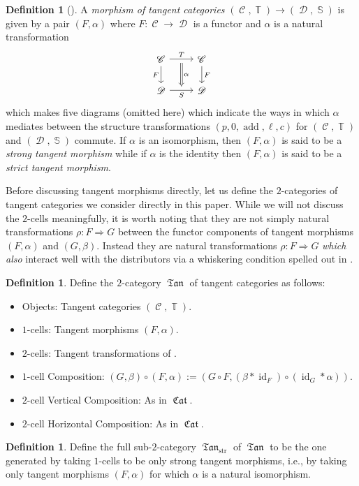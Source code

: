 \documentclass{amsart}
\theoremstyle{definition}
\newtheorem{definition}[equation]{Definition}
\DeclareMathOperator{\Cscr}{\mathscr{C}}
\DeclareMathOperator{\Dscr}{\mathscr{D}}
\DeclareMathOperator{\Sbb}{\mathbb{S}}
\DeclareMathOperator{\Tbb}{\mathbb{T}}
\DeclareMathOperator{\fTan}{\mathfrak{Tan}}
\DeclareMathOperator{\id}{id}
\DeclareMathOperator{\fCat}{\mathfrak{Cat}}
\numberwithin{equation}{subsection}
\begin{document}
\begin{definition}[{\cite[Definition 2.7]{GeoffRobinDiffStruct}}]\label{Defn: Tangent morphism}
	A \emph{morphism of tangent categories} $(\Cscr,\Tbb) \to (\Dscr,\Sbb)$ is given by a pair $(F,\alpha)$ where $F:\Cscr \to \Dscr$ is a functor and $\alpha$ is a natural transformation
	\[
	\begin{tikzcd}
		\Cscr \ar[r, ""{name = U}]{}{T} \ar[d, swap]{}{F} & \Cscr \ar[d]{}{F} \\
		\Dscr \ar[r, swap, ""{name = D}]{}{S} & \Dscr
		\ar[from = U, to = D, Rightarrow, shorten <= 4pt, shorten >= 4pt]{}{\alpha}
	\end{tikzcd}
	\]
	which makes five diagrams (omitted here) which indicate the ways in which $\alpha$ mediates between the structure transformations $(p,0,\operatorname{add},\ell,c)$ for $(\Cscr,\Tbb)$ and $(\Dscr,\Sbb)$ commute. If $\alpha$ is an isomorphism, then $(F,\alpha)$ is said to be a \emph{strong tangent morphism} while if $\alpha$ is the identity then $(F,\alpha)$ is said to be a \emph{strict tangent morphism}.
\end{definition}
Before discussing tangent morphisms directly, let us define the $2$-categories of tangent categories we consider directly in this paper. While we will not discuss the $2$-cells meaningfully, it is worth noting that they are not simply natural transformations $\rho:F \Rightarrow G$ between the functor components of tangent morphisms $(F,\alpha)$ and $(G,\beta)$. Instead they are natural transformations $\rho:F \Rightarrow G$ \emph{which also} interact well with the distributors via a whiskering condition spelled out in \cite{GarnerEmbeddingTanCat}.
\begin{definition}
Define the $2$-category $\fTan$ of tangent categories as follows:
\begin{itemize}
	\item Objects: Tangent categories $(\Cscr,\Tbb)$.
	\item $1$-cells: Tangent morphisms $(F,\alpha)$.
	\item $2$-cells: Tangent transformations of \cite{GarnerEmbeddingTanCat}.
	\item $1$-cell Composition: $(G,\beta) \circ (F,\alpha) := (G \circ F, (\beta \ast \id_F) \circ (\id_G \ast \alpha))$.
	\item $2$-cell Vertical Composition: As in $\fCat$.
	\item $2$-cell Horizontal Composition: As in $\fCat$.
\end{itemize}
\end{definition}
\begin{definition}
Define the full sub-$2$-category $\fTan_{\operatorname{str}}$ of $\fTan$ to be the one generated by taking $1$-cells to be only strong tangent morphisms, i.e., by taking only tangent morphisms $(F,\alpha)$ for which $\alpha$ is a natural isomorphism.
\end{definition}
\end{document}

